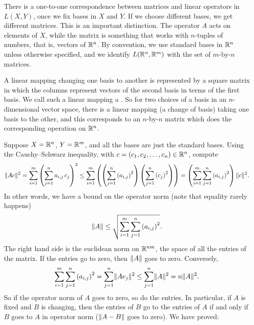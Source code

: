 There is a one-to-one correspondence between matrices and linear operators in
$L(X,Y)$, once we fix bases in $X$ and $Y$.  If we 
choose different bases, we get different matrices.
This is an important distinction.
The operator $A$ acts on elements of $X$, while the matrix
is something that works with $n$-tuples of numbers, that is, vectors of
${\mathbb{R}}^n$.  By convention, we use standard bases in ${\mathbb{R}}^n$ unless otherwise
specified, and we identify $L({\mathbb{R}}^n,{\mathbb{R}}^m)$ with the set of $m$-by-$n$ matrices.

A linear mapping changing one basis to another is represented by a
square matrix in which the columns represent vectors
of the second basis in terms of the first basis.  We call such a linear
mapping a \emph{}.  So for two choices of a
basis in an $n$-dimensional vector space, there is a linear mapping
(a change of basis)
taking one basis to the other, and this corresponds to an $n$-by-$n$
matrix which does the corresponding operation on ${\mathbb{R}}^n$.

\medskip

Suppose
$X={\mathbb{R}}^n$, $Y={\mathbb{R}}^m$, and
all the bases are just the standard bases.
Using the Cauchy--Schwarz inequality, with $c=(c_1,c_2,\ldots,c_n) \in {\mathbb{R}}^n$, compute
\begin{equation*}
\lVert {Ac} \rVert^2
=
\sum_{i=1}^m { \left(\sum_{j=1}^n a_{i,j} \, c_j \right)}^2
\leq
\sum_{i=1}^m
\left(
\left(\sum_{j=1}^n {(a_{i,j})}^2 \right)
\left(\sum_{j=1}^n {(c_j)}^2 \right)
\right)
=
\left(
\sum_{i=1}^m \sum_{j=1}^n {(a_{i,j})}^2 \right)
\lVert {c} \rVert^2 .
\end{equation*}
In other words, we have a bound on the operator norm (note that equality
rarely happens)
\begin{equation*}
\lVert {A} \rVert \leq
\sqrt{\sum_{i=1}^m \sum_{j=1}^n {(a_{i,j})}^2} .
\end{equation*}
The right hand side is the euclidean norm on ${\mathbb{R}}^{nm}$, the space
of all the entries of the matrix.
If the entries go to zero, then $\lVert {A} \rVert$ goes to zero.
Conversely,
\begin{equation*}
\sum_{i=1}^m \sum_{j=1}^n {(a_{i,j})}^2
=
\sum_{j=1}^n \lVert {A e_j} \rVert^2
\leq
\sum_{j=1}^n \lVert {A} \rVert^2
= n \lVert {A} \rVert^2 .
\end{equation*}
So if the operator norm of $A$ goes to zero, so do the entries.
In particular, if $A$ is fixed and $B$ is changing,
then the entries of $B$ go to the entries of $A$ if and only if $B$ goes to $A$ in
operator norm ($\lVert {A-B} \rVert$ goes to zero).  We have proved:

